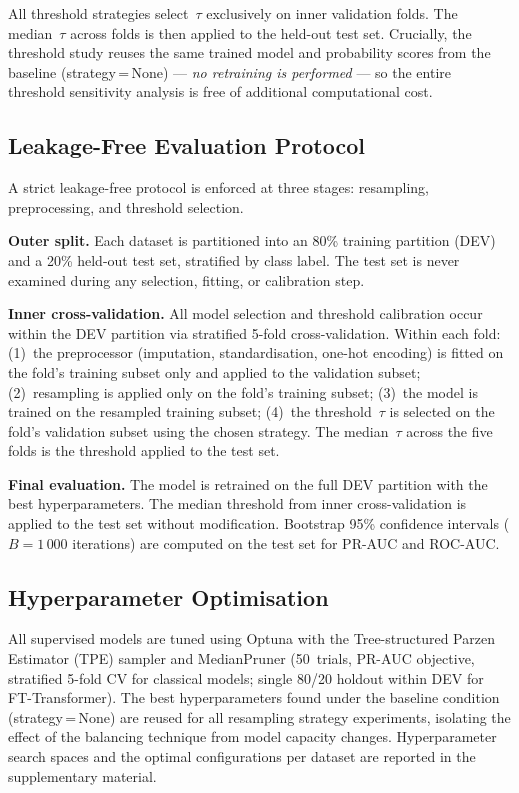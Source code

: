 \documentclass[a4paper,fleqn]{cas-sc}
\begin{document}
All threshold strategies select~$\tau$ exclusively on inner validation folds.
The median~$\tau$ across folds is then applied to the held-out test set.
Crucially, the threshold study reuses the same trained model and probability scores from
the baseline (strategy\,=\,None) --- \emph{no retraining is performed} --- so the entire
threshold sensitivity analysis is free of additional computational cost.

\subsection{Leakage-Free Evaluation Protocol}
\label{subsec:protocol}

A strict leakage-free protocol is enforced at three stages: resampling, preprocessing, and
threshold selection.

\textbf{Outer split.}
Each dataset is partitioned into an 80\% training partition (DEV) and a 20\% held-out
test set, stratified by class label.
The test set is never examined during any selection, fitting, or calibration step.

\textbf{Inner cross-validation.}
All model selection and threshold calibration occur within the DEV partition via stratified
5-fold cross-validation.
Within each fold: (1)~the preprocessor (imputation, standardisation, one-hot encoding)
is fitted on the fold's training subset only and applied to the validation subset;
(2)~resampling is applied only on the fold's training subset; (3)~the model is trained
on the resampled training subset; (4)~the threshold~$\tau$ is selected on the fold's
validation subset using the chosen strategy.
The median~$\tau$ across the five folds is the threshold applied to the test set.

\textbf{Final evaluation.}
The model is retrained on the full DEV partition with the best hyperparameters.
The median threshold from inner cross-validation is applied to the test set without
modification.
Bootstrap 95\% confidence intervals ($B\!=\!1\,000$ iterations) are computed on the
test set for PR-AUC and ROC-AUC.

\subsection{Hyperparameter Optimisation}
\label{subsec:hpo}

All supervised models are tuned using Optuna \citep{akiba2019optuna} with the
Tree-structured Parzen Estimator (TPE) sampler and MedianPruner (50~trials,
PR-AUC objective, stratified 5-fold CV for classical models;
single 80/20 holdout within DEV for FT-Transformer).
The best hyperparameters found under the baseline condition (strategy\,=\,None) are
reused for all resampling strategy experiments, isolating the effect of the balancing
technique from model capacity changes.
Hyperparameter search spaces and the optimal configurations per dataset are reported
in the supplementary material.
\end{document}
